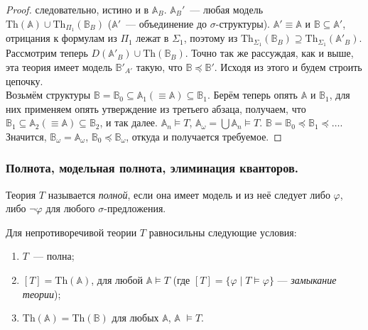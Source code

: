 \begin{proof}
    следовательно, истино и в $\mathbb{A}_B$. $\mathbb{A}_B'$~— любая модель $\text{Th}(\mathbb{A}) \cup \text{Th}_{\Pi_1}(\mathbb{B}_B)$ ($\mathbb{A}'$~— объединение до $\sigma$-структуры). $\mathbb{A}' \equiv \mathbb{A}$ и $\mathbb{B} \subseteq \mathbb{A}'$, отрицания к формулам из $\Pi_1$ лежат в $\Sigma_1$, поэтому из $\text{Th}_{\Sigma_1}(\mathbb{B}_B) \supseteq \text{Th}_{\Sigma_1}(\mathbb{A}'_B)$. \\ 

    Рассмотрим теперь $D(\mathbb{A}'_B) \cup \text{Th}(\mathbb{B}_B)$. Точно так же рассуждая, как и выше, эта теория имеет модель $\mathbb{B}'_{A'}$ такую, что $\mathbb{B} \preceq \mathbb{B}'$. Исходя из этого и будем строить цепочку. \\ 

    Возьмём структуры $\mathbb{B} = \mathbb{B}_0 \subseteq \mathbb{A}_1 (\equiv \mathbb{A}) \subseteq \mathbb{B}_1$. Берём теперь опять $\mathbb{A}$ и $\mathbb{B}_1$, для них применяем опять утверждение из третьего абзаца, получаем, что $\mathbb{B}_1 \subseteq \mathbb{A}_2 (\equiv \mathbb{A}) \subseteq \mathbb{B}_2$, и так далее. $\mathbb{A}_n \models T$, $\mathbb{A}_\omega = \bigcup \mathbb{A}_n \models T$. $\mathbb{B} = \mathbb{B}_0 \preceq \mathbb{B}_1 \preceq \ldots$. Значится, $\mathbb{B}_\omega = \mathbb{A}_\omega$, $\mathbb{B}_0 \preceq \mathbb{B}_\omega$, откуда и получается требуемое.
\end{proof}

\subsubsection{Полнота, модельная полнота, элиминация кванторов.} 

\begin{definition}
    Теория $T$ называется \textit{полной}, если она имеет модель и из неё следует либо $\varphi$, либо $\neg \varphi$ для любого $\sigma$-предложения.
\end{definition}

\begin{stat}
    Для непротиворечивой теории $T$ равносильны следующие условия: 
    \begin{enumerate}
        \item $T$~— полна; 
        \item $[T] = \text{Th} (\mathbb{A})$, для любой $\mathbb{A} \models T$ (где $[T] = \{\varphi \mid T \models \varphi\}$ — \emph{замыкание теории}); 
        \item $\text{Th}(\mathbb{A}) = \text{Th}(\mathbb{B})$ для любых $\mathbb{A}$, $\mathbb{A}$ $\models T$.
    \end{enumerate}
\end{stat}


